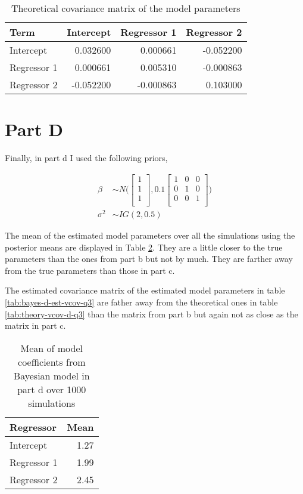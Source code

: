 \documentclass[]{book}
\begin{document}
\begin{table}

\caption{\label{tab:theory-vcov-c-q3}Theoretical covariance matrix of the model parameters}
\centering
\begin{tabular}[t]{lrrr}
\toprule
Term & Intercept & Regressor 1 & Regressor 2\\
\midrule
Intercept & 0.032600 & 0.000661 & -0.052200\\
Regressor 1 & 0.000661 & 0.005310 & -0.000863\\
Regressor 2 & -0.052200 & -0.000863 & 0.103000\\
\bottomrule
\end{tabular}
\end{table}

\hypertarget{part-d-2}{%
\section{Part D}\label{part-d-2}}

Finally, in part d I used the following priors,

\begin{align}
  \beta &\sim N \bigg( 
  \begin{bmatrix}
  1\\
  1\\
  1\\
  \end{bmatrix},
  0.1 \begin{bmatrix}
  1 & 0 & 0\\
  0 & 1 & 0\\
  0 & 0 & 1\\
  \end{bmatrix} \bigg)\\
  \sigma^2 &\sim IG(2, 0.5)
\end{align}

The mean of the estimated model parameters over all the simulations using the posterior means are displayed in Table \ref{tab:bayes-d-mean-coefs-q3}. They are a little closer to the true parameters than the ones from part b but not by much. They are farther away from the true parameters than those in part c.

The estimated covariance matrix of the estimated model parameters in table \ref{tab:bayes-d-est-vcov-q3} are father away from the theoretical ones in table \ref{tab:theory-vcov-d-q3} than the matrix from part b but again not as close as the matrix in part c.

\begin{table}

\caption{\label{tab:bayes-d-mean-coefs-q3}Mean of model coefficients from Bayesian model in part d over 1000 simulations}
\centering
\begin{tabular}[t]{lr}
\toprule
Regressor & Mean\\
\midrule
Intercept & 1.27\\
Regressor 1 & 1.99\\
Regressor 2 & 2.45\\
\bottomrule
\end{tabular}
\end{table}
\end{document}
